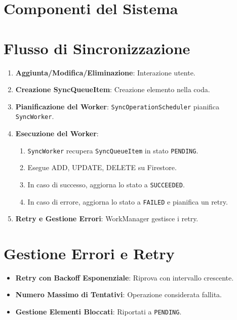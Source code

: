 \documentclass{article}
\begin{document}
\section{Componenti del Sistema}\label{sec:componenti-del-sistema}


\section{Flusso di Sincronizzazione}\label{sec:flusso-di-sincronizzazione}
\begin{enumerate}
    \item \textbf{Aggiunta/Modifica/Eliminazione}: Interazione utente.
    \item \textbf{Creazione SyncQueueItem}: Creazione elemento nella coda.
    \item \textbf{Pianificazione del Worker}: \texttt{SyncOperationScheduler}
    pianifica \texttt{SyncWorker}.
    \item \textbf{Esecuzione del Worker}:
    \begin{enumerate}
        \item \texttt{SyncWorker} recupera \texttt{SyncQueueItem} in stato
        \texttt{PENDING}.
        \item Esegue ADD, UPDATE, DELETE su Firestore.
        \item In caso di successo, aggiorna lo stato a \texttt{SUCCEEDED}.
        \item In caso di errore, aggiorna lo stato a \texttt{FAILED} e pianifica
        un retry.
    \end{enumerate}
    \item \textbf{Retry e Gestione Errori}: WorkManager gestisce i retry.
\end{enumerate}

\section{Gestione Errori e Retry}\label{sec:gestione-errori-e-retry}
\begin{itemize}
    \item \textbf{Retry con Backoff Esponenziale}: Riprova con intervallo
    crescente.
    \item \textbf{Numero Massimo di Tentativi}: Operazione considerata fallita.
    \item \textbf{Gestione Elementi Bloccati}: Riportati a \texttt{PENDING}.
\end{itemize}
\end{document}
